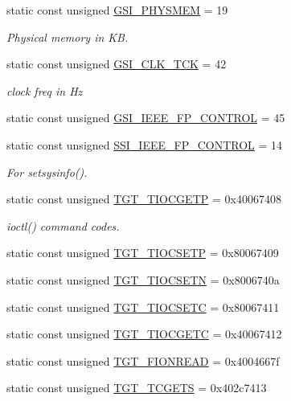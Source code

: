\begin{Indent}{\bf }
\begin{DoxyCompactItemize}
static const unsigned \hyperlink{classAlphaLinux_a2c859016d59653914527bcd85a154da4}{GSI\_\-PHYSMEM} = 19
\begin{DoxyCompactList}\small\item\em Physical memory in KB. \item\end{DoxyCompactList}\item 
static const unsigned \hyperlink{classAlphaLinux_a26c255cf18ca324c7c09a629e9e2a4f0}{GSI\_\-CLK\_\-TCK} = 42
\begin{DoxyCompactList}\small\item\em clock freq in Hz \item\end{DoxyCompactList}\item 
static const unsigned \hyperlink{classAlphaLinux_a8e5f505720dffbfd8b8bd0ed4d95cdb1}{GSI\_\-IEEE\_\-FP\_\-CONTROL} = 45
\item 
static const unsigned \hyperlink{classAlphaLinux_a4dea1885b08c38c78286ecd5ffd5488d}{SSI\_\-IEEE\_\-FP\_\-CONTROL} = 14
\begin{DoxyCompactList}\small\item\em For setsysinfo(). \item\end{DoxyCompactList}\item 
static const unsigned \hyperlink{classAlphaLinux_a90fcc56bd4aa74a5d86c87bfeae77625}{TGT\_\-TIOCGETP} = 0x40067408
\begin{DoxyCompactList}\small\item\em ioctl() command codes. \item\end{DoxyCompactList}\item 
static const unsigned \hyperlink{classAlphaLinux_a194059e48b091a80833c40b500e70bec}{TGT\_\-TIOCSETP} = 0x80067409
\item 
static const unsigned \hyperlink{classAlphaLinux_a6783bea53088dc89157c39a9a7c71988}{TGT\_\-TIOCSETN} = 0x8006740a
\item 
static const unsigned \hyperlink{classAlphaLinux_a98595955a801e37d1d5be450c203afe5}{TGT\_\-TIOCSETC} = 0x80067411
\item 
static const unsigned \hyperlink{classAlphaLinux_ad4f95fbdb4f52f68481c247267675007}{TGT\_\-TIOCGETC} = 0x40067412
\item 
static const unsigned \hyperlink{classAlphaLinux_a1def346ff527c8efccfd52463f3b5dc1}{TGT\_\-FIONREAD} = 0x4004667f
\item 
static const unsigned \hyperlink{classAlphaLinux_a50e5d880569ec2cb9a2f3d4aaa55cc64}{TGT\_\-TCGETS} = 0x402c7413

\end{DoxyCompactItemize}
\end{Indent}
